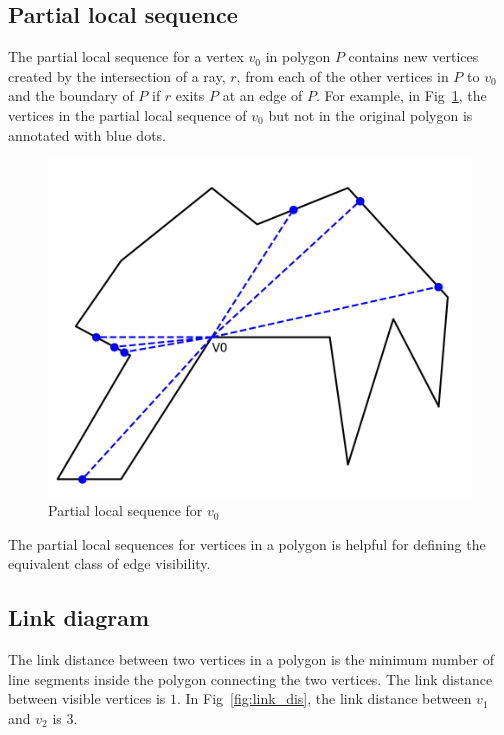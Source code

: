 \documentclass[letterpaper, 10 pt, conference]{ieeeconf}  %
\begin{document}
\subsection{Partial local sequence}

The partial local sequence for a vertex $v_0$ in polygon $P$ contains new vertices created by the intersection of a ray, $r$, from each of the other vertices in $P$ to $v_0$ and the boundary of $P$ if $r$ exits $P$ at an edge of $P$. For example, in Fig~\ref{fig:pls}, the vertices in the partial local sequence of $v_0$ but not in the original polygon is annotated with blue dots.
\begin{figure}
    \includegraphics[width=0.8\linewidth]{images/partial_local_sequence.png}
    \centering
    \caption{Partial local sequence for $v_0$}\label{fig:pls}
    \centering
\end{figure}
The partial local sequences for vertices in a polygon is helpful for defining the equivalent class of edge visibility.



\subsection{Link diagram}

The link distance between two vertices in a polygon is the minimum number of line segments inside the polygon connecting the two vertices. The link distance between visible vertices is $1$. In Fig~\ref{fig:link_dis}, the link distance between $v_1$ and $v_2$ is 3.
\end{document}
